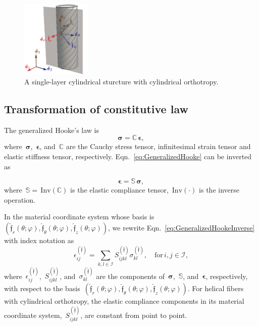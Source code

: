\documentclass[preprint,10pt,times]{elsarticle}
\numberwithin{equation}{section}
\newcommand{\physf}{\hat{\boldsymbol{\mathfrak{f}}}}
\renewcommand{\u}[1]{\boldsymbol{#1}}
\newcommand{\pr}[1]{\left( #1 \right)}
\newcommand{\Inv}{\,\mathrm{Inv}}
\renewcommand{\>}{$\Rightarrow$}
\begin{document}
\begin{figure}[t]
	\centering
	\graphicspath{{../LyxFiles/figure/}}
	\includegraphics[width=0.3\textwidth]{schematic_V5.pdf}
	\caption{A single-layer cylindrical sturcture with cylindrical orthotropy.
  }
	\label{fig:schematic}
\end{figure}

\subsection{Transformation of constitutive law}
\label{sec:MatrixTrans}
The generalized Hooke's law is
\begin{equation}
\u{\sigma} = \mathbb{C}\, \u{\epsilon},
\label{eq:GeneralizedHooke}
\end{equation}
where~$\u{\sigma}$,~$\u{\epsilon}$, and~$\mathbb{C}$ are the Cauchy stress tensor, infinitesimal strain tensor and elastic stiffness tensor, respectively. Eqn.~\eqref{eq:GeneralizedHooke} can be inverted as

\begin{equation}
 \u{\epsilon} = \mathbb{S}\, \u{\sigma},
\label{eq:GeneralizedHookeInverse}
\end{equation}
where~$\mathbb{S} = \Inv\pr{\mathbb{C}}$ is the elastic compliance tensor, $\Inv\pr{\cdot}$ is the inverse operation.

In the material coordinate system whose basis is~$\pr{\physf_{r}(\theta;\varphi),\physf_{\theta}(\theta;\varphi),\physf_{z}(\theta;\varphi)}$, we rewrite Eqn.~\eqref{eq:GeneralizedHookeInverse} with index notation as
\begin{equation}
\epsilon_{ij}^{\pr{\physf}} = \sum_{k,l \in \mathcal{I}}  S_{ijkl}^{\pr{\physf}} \sigma_{kl}^{\pr{\physf}}, \quad \text{for} \,i,j \in \mathcal{I} ,
\label{eq:GeneralizedHookeComponents}
\end{equation}
where~$\epsilon_{ij}^{\pr{\physf}}$,~$S_{ijkl}^{\pr{\physf}}$, and~$\sigma_{kl}^{\pr{\physf}}$ are the components of~$\u{\sigma}$,~$\mathbb{S}$, and~$\u{\epsilon}$, respectively, with respect to the basis~$\pr{\physf_{r}(\theta;\varphi),\physf_{\theta}(\theta;\varphi),\physf_{z}(\theta;\varphi)}$. For helical fibers with cylindrical orthotropy, the elastic compliance components in its material coordinate system,~$S_{ijkl}^{\pr{\physf}}$, are constant from point to point.
\end{document}
